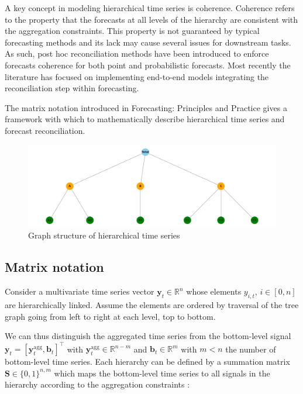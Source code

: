 \documentclass[letterpaper]{article}
\begin{document}
A key concept in modeling hierarchical time series is coherence. Coherence refers to the property that the forecasts at all levels of the hierarchy are consistent with the aggregation constraints. This property is not guaranteed by typical forecasting methods and its lack may cause several issues for downstream tasks. As such, post hoc reconciliation methods have been introduced to enforce forecasts coherence for both point and probabilistic forecasts. Most recently the literature has focused on implementing end-to-end models integrating the reconciliation step within forecasting.

The matrix notation introduced in Forecasting: Principles and Practice \cite{bookhyndman} gives a framework with which to mathematically describe hierarchical time series and forecast reconciliation.

\begin{figure}
    \centering
    \includegraphics[width=\linewidth]{graph_nodes.png}
    \caption{Graph structure of hierarchical time series}
    \label{fig:hierarchy}
\end{figure}

\subsection{Matrix notation} \label{sec:matrix}

Consider a multivariate time series vector $ \mathbf{y}_t \in \mathbb{R}^n $ whose elements $y_{i,t}$,  $ i\in[0,n]$ are hierarchically linked. Assume the elements are ordered by traversal of the tree graph going from left to right at each level, top to bottom. 

We can thus distinguish the aggregated time series from the bottom-level signal $\mathbf{y}_t = [\mathbf{y}^{\mathrm{agg}}_t,\mathbf{b}_t]^{\top} $ with $\mathbf{y}^{\mathrm{agg}}_t \in \mathbb{R}^{n-m}$ and $\mathbf{b}_t \in \mathbb{R}^{m}$ with $m < n$ the number of bottom-level time series. Each hierarchy can be defined by a summation matrix $\mathbf{S} \in \{0,1\}^{n,m}$ which maps the bottom-level time series to all signals in the hierarchy according to the aggregation constraints :
\end{document}
